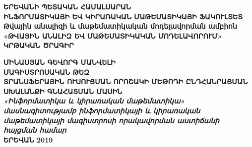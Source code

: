 \documentclass[12pt]{article}
\begin{document}
\newtheorem{theorem}{Թեորեմ}
\newtheorem{lemma}{Լեմմա}
\newtheorem{corollary}{Հետևանք}
\newtheorem{preposition}{Պնդում}
\newtheorem{defination}{Սահմանում}


\theoremstyle{definition} %
\newtheorem{innercustomcase}{Դեպք}
\newenvironment{customcase}[1]
  {\renewcommand\theinnercustomcase{#1}\innercustomcase}
  {\endinnercustomcase}
\newtheorem{case}{Դեպք}

\raggedbottom


\begin{titlepage}

\begin{center}
{\fontsize{18pt}{18pt} \selectfont \textbf{ԵՐԵՎԱՆԻ ՊԵՏԱԿԱՆ ՀԱՄԱԼՍԱՐԱՆ\\}} 
\vspace{7mm}
{\fontsize{18pt}{18pt} \selectfont \textbf{ԻՆՖՈՐՄԱՏԻԿԱՅԻ ԵՎ ԿԻՐԱՌԱԿԱՆ ՄԱԹԵՄԱՏԻԿԱՅԻ ՖԱԿՈՒԼՏԵՏ\\}}
\vspace{7mm}
{\fontsize{16pt}{16pt} \selectfont \textbf{ Թվային անալիզի և մաթեմատիկական մոդելավորման ամբիոն\\}}
\vspace{7mm}
{\fontsize{18pt}{18pt} \selectfont \textbf{ «ԹՎԱՅԻՆ ԱՆԱԼԻԶ ԵՎ ՄԱԹԵՄԱՏԻԿԱԿԱՆ ՄՈԴԵԼԱՎՈՐՈՒՄ»
ԿՐԹԱԿԱՆ ԾՐԱԳԻՐ\\}}

\vspace{25mm}
{\fontsize{18pt}{18pt} \selectfont \textbf{ՄԻՆԱՍՅԱՆ ԳԵՎՈՐԳ ՄԱՆՎԵԼԻ\\}}
\vspace{15mm}
{\fontsize{18pt}{18pt} \selectfont \textbf{ՄԱԳԻՍՏՐՈՍԱԿԱՆ ԹԵԶ\\}}
\vspace{5mm}
{\fontsize{16pt}{16pt} \selectfont \textbf{ՏՐԱՆՍՖԵՐԱՅԻՆ ՈՒՍՈՒՑՄԱՆ ՈՐՈՇԱԿԻ ՄԵԹՈԴԻ ԸՆԴՀԱՆՐԱՑՄԱՆ ՍԽԱԼԱՆՔԻ ԳՆԱՀԱՏՄԱՆ ՄԱՍԻՆ\\}}
\vspace{15mm}
{\fontsize{14pt}{14pt} \selectfont \textit{\textbf{«Ինֆորմատիկա և կիրառական մաթեմատիկա»  մասնագիտությամբ 
ինֆորմատիկայի և կիրառական մաթեմատիկայի մագիստրոսի որակավորման աստիճանի հայցման համար\\}}}
\vspace{30mm}
{\fontsize{13pt}{13pt} \selectfont \textbf{ ԵՐԵՎԱՆ 2019\\}}
\end{center}

\end{titlepage}
\end{document}
